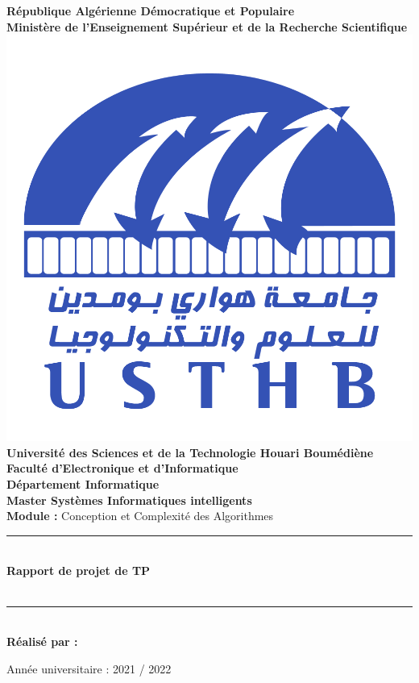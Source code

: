 \documentclass[12pt]{report}
\newcommand{\HRule}{\rule{\linewidth}{0.5mm}}
\begin{document}
    \begin{titlepage}
        \begin{center}
            \textbf{République Algérienne Démocratique et Populaire}\\
            \textbf{Ministère de l'Enseignement Supérieur et de la Recherche Scientifique}\\[1cm]
            
            \includegraphics[scale=0.5]{./ressources/USTHB_Logo.png}\\[1cm]
            
            \large
            \textbf{Université des Sciences et de la Technologie Houari Boumédiène}\\[0.5cm]
            \textbf{Faculté d'Electronique et d'Informatique}\\
            \textbf{Département Informatique}\\[0.5cm]

            \Large
            \textbf{Master Systèmes Informatiques intelligents}\\[0.5cm]
            
            \textbf{Module :} Conception et Complexité des Algorithmes

            \HRule \\[0.4cm]
            \LARGE{\textbf{Rapport de projet de TP}\\
            \textit{}\\[0.4cm]}
            \HRule \\[2cm]
            
            \large
            \textbf{Réalisé par :} 
            
            \vfill
            Année universitaire : 2021 / 2022
        \end{center}
    \end{titlepage}
    \normalsize

    \newpage
    \onehalfspacing
    

    \newpage
    \onehalfspacing
    

    \newpage
    \onehalfspacing
    

    \newpage
    \onehalfspacing
    
\end{document}
